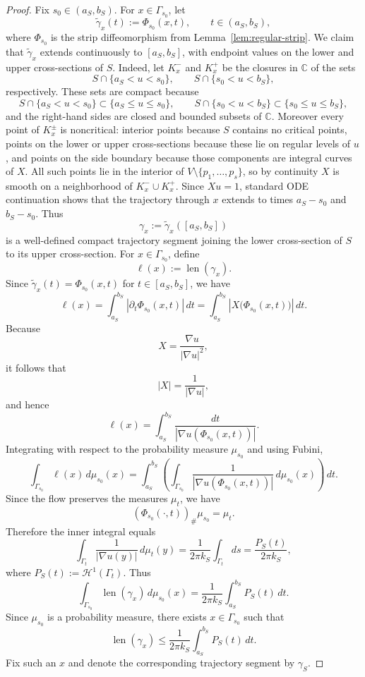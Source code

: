 \documentclass[12pt]{amsart}
\theoremstyle{definition}
\theoremstyle{remark}
\begin{document}
\begin{proof}
\indent Fix $s_0\in(a_S,b_S)$. For $x\in\Gamma_{s_0}$, let
\[
\widetilde\gamma_x(t):=\Phi_{s_0}(x,t),\qquad t\in(a_S,b_S),
\]
where $\Phi_{s_0}$ is the strip diffeomorphism from Lemma~\ref{lem:regular-strip}. We claim that $\widetilde\gamma_x$ extends continuously to
$[a_S,b_S]$, with endpoint values on the lower and upper cross-sections of $S$. Indeed, let $K_x^-$ and $K_x^+$
be the closures in $\mathbb{C}$ of the sets
\[
 S\cap\{a_S<u<s_0\}, \qquad S\cap\{s_0<u<b_S\},
\]
respectively. These sets are compact because
\[
S\cap\{a_S<u<s_0\}\subset\{a_S\le u\le s_0\},\qquad S\cap\{s_0<u<b_S\}\subset\{s_0\le u\le b_S\},
\]
and the right-hand sides are closed and bounded subsets of $\mathbb{C}$. Moreover every point of $K_x^{\pm}$ is
noncritical: interior points because $S$ contains no critical points, points on the lower or upper
cross-sections because these lie on regular levels of $u$, and points on the side boundary because
those components are integral curves of $X$. All such points lie in the interior of $V\setminus\{p_1,\dots,p_s\}$,
so by continuity $X$ is smooth on a neighborhood of $K_x^-\cup K_x^+$. Since $Xu=1$, standard ODE
continuation shows that the trajectory through $x$ extends to times $a_S-s_0$ and $b_S-s_0$. Thus
\[
\gamma_x:=\widetilde\gamma_x([a_S,b_S])
\]
is a well-defined compact trajectory segment joining the lower cross-section of $S$ to its upper
cross-section. For $x\in\Gamma_{s_0}$, define
\[
\ell(x):=\operatorname{len}(\gamma_x).
\]
Since $\widetilde\gamma_x(t)=\Phi_{s_0}(x,t)$ for $t\in[a_S,b_S]$, we have
\[
\ell(x)
=
\int_{a_S}^{b_S}\left|\partial_t\Phi_{s_0}(x,t)\right|\,dt
=
\int_{a_S}^{b_S}\left|X\bigl(\Phi_{s_0}(x,t)\bigr)\right|\,dt.
\]
Because
\[
X=\frac{\nabla u}{|\nabla u|^2},
\]
it follows that
\[
|X|=\frac{1}{|\nabla u|},
\]
and hence
\[
\ell(x)
=
\int_{a_S}^{b_S}\frac{dt}{|\nabla u(\Phi_{s_0}(x,t))|}.
\]
Integrating with respect to the probability measure $\mu_{s_0}$ and using Fubini,
\[
\int_{\Gamma_{s_0}}\ell(x)\,d\mu_{s_0}(x)
=
\int_{a_S}^{b_S}
\left(
\int_{\Gamma_{s_0}}
\frac{1}{|\nabla u(\Phi_{s_0}(x,t))|}
\,d\mu_{s_0}(x)
\right)\,dt.
\]
Since the flow preserves the measures $\mu_t$, we have
\[
(\Phi_{s_0}(\cdot,t))_{\#}\mu_{s_0}=\mu_t.
\]
Therefore the inner integral equals
\[
\int_{\Gamma_t}\frac{1}{|\nabla u(y)|}\,d\mu_t(y)
=
\frac{1}{2\pi k_S}\int_{\Gamma_t} ds
=
\frac{P_S(t)}{2\pi k_S},
\]
where $P_S(t):=\mathcal H^1(\Gamma_t)$. Thus
\[
\int_{\Gamma_{s_0}} \operatorname{len}(\gamma_x)\,d\mu_{s_0}(x)
=
\frac{1}{2\pi k_S}\int_{a_S}^{b_S} P_S(t)\,dt.
\]
Since $\mu_{s_0}$ is a probability measure, there exists $x\in \Gamma_{s_0}$ such that
\[
\operatorname{len}(\gamma_x)\le \frac{1}{2\pi k_S}\int_{a_S}^{b_S} P_S(t)\,dt.
\]
Fix such an $x$ and denote the corresponding trajectory segment by $\gamma_S$.


\end{proof}
\end{document}
